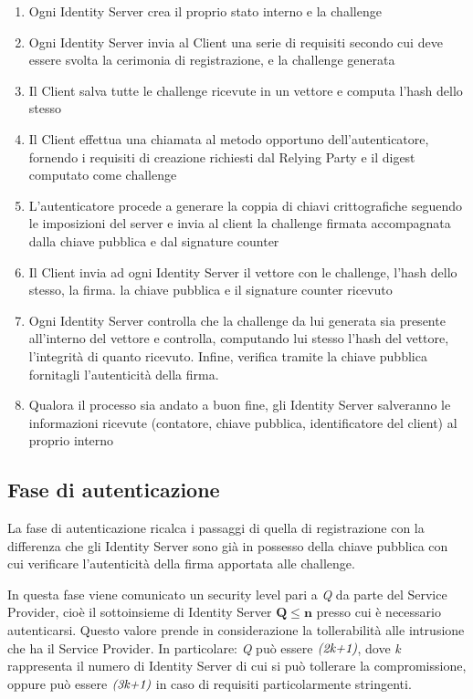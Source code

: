 \begin{enumerate}
	\item Ogni Identity Server crea il proprio stato interno e la challenge
	\item Ogni Identity Server invia al Client una serie di requisiti secondo cui deve essere svolta la cerimonia di registrazione, e la challenge generata
	\item Il Client salva tutte le challenge ricevute in un vettore e computa l'hash dello stesso
	\item Il Client effettua una chiamata al metodo opportuno dell'autenticatore, fornendo i requisiti di creazione richiesti dal Relying Party e il digest computato come challenge
	\item L'autenticatore procede a generare la coppia di chiavi crittografiche seguendo le imposizioni del server e invia al client la challenge firmata accompagnata dalla chiave pubblica e dal signature counter
	\item Il Client invia ad ogni Identity Server il vettore con le challenge, l'hash dello stesso, la firma. la chiave pubblica e il signature counter ricevuto
	\item Ogni Identity Server controlla che la challenge da lui generata sia presente all'interno del vettore e controlla, computando lui stesso l'hash del vettore, l'integrità di quanto ricevuto. Infine, verifica tramite la chiave pubblica fornitagli l'autenticità della firma.
	\item Qualora il processo sia andato a buon fine, gli Identity Server salveranno le informazioni ricevute (contatore, chiave pubblica, identificatore del client) al proprio interno
\end{enumerate} 

\subsection{Fase di autenticazione}
\label{autenticazione}

La fase di autenticazione ricalca i passaggi di quella di registrazione con la differenza che gli Identity Server sono già in possesso della chiave pubblica con cui verificare l'autenticità della firma apportata alle challenge. 

In questa fase viene comunicato un security level pari a \emph{Q} da parte del Service Provider, cioè il sottoinsieme di Identity Server $\mathbf{Q\leq n}$ presso cui è necessario autenticarsi. Questo valore prende in considerazione la tollerabilità alle intrusione che ha il Service Provider. In particolare: \emph{Q} può essere $ \emph{(2k+1)} $, dove \emph{k} rappresenta il numero di Identity Server di cui si può tollerare la compromissione, oppure può essere $ \emph{(3k+1)} $ in caso di requisiti particolarmente stringenti. 

